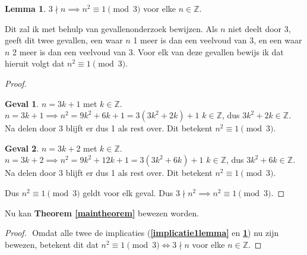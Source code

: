 \documentclass[12pt, dutch, a4paper]{article}
\theoremstyle{definition}
\newtheorem{lemma}{Lemma}[theorem]
\newtheorem{case}{Geval}
\begin{document}
\newpage
\begin{lemma} \label{implicatie2lemma}
    $3 \nmid n \implies n^2 \equiv 1 \pmod{3} $ voor elke $n \in \mathbb{Z}$. 
\end{lemma}

Dit zal ik met behulp van gevallenonderzoek bewijzen. 
Als $n$ niet deelt door 3, geeft dit twee gevallen, een waar $n$ 1 meer is dan 
een veelvoud van 3, en een waar $n$ 2 meer is dan een veelvoud van 3. Voor elk 
van deze gevallen bewijs ik dat hieruit volgt dat $n^2 \equiv 1 \pmod{3}$.

\begin{proof} 
    \begin{case} $n = 3k + 1$ met $k \in \mathbb{Z}$. \newline
        $n = 3k + 1 \implies n^2 = 9k^2 + 6k + 1 = 3(3k^2 + 2k) + 1$ \newline
        $k \in \mathbb{Z}$, dus $3k^2 + 2k \in \mathbb{Z}$. \newline 
        Na delen door 3 blijft er dus 1 als rest over. \newline 
        Dit betekent $n^2 \equiv 1 \pmod{3}$.
    \end{case}
    \begin{case} $n = 3k + 2$ met $k \in \mathbb{Z}$. \newline
        $n = 3k + 2 \implies n^2 = 9k^2 + 12k + 1 = 3(3k^2 + 6k) + 1$ \newline
        $k \in \mathbb{Z}$, dus $3k^2 + 6k \in \mathbb{Z}$. \newline 
        Na delen door 3 blijft er dus 1 als rest over. \newline 
        Dit betekent $n^2 \equiv 1 \pmod{3}$.
    \end{case}
    Dus $n^2 \equiv 1 \pmod{3}$ geldt voor elk geval. \newline
    Dus $3 \nmid n^2 \implies n^2 \equiv 1 \pmod{3}$.
\end{proof}

Nu kan \textbf{Theorem \ref{maintheorem}} bewezen worden.
\begin{proof} $ $ \newline
    Omdat alle twee de implicaties 
    (\textbf{\cref{implicatie1lemma}} en \textbf{\cref{implicatie2lemma}})
    nu zijn bewezen, betekent dit dat
    $n^2 \equiv 1 \pmod{3} \iff 3 \nmid n$ voor elke $n \in \mathbb{Z}$.
\end{proof}
\end{document}
